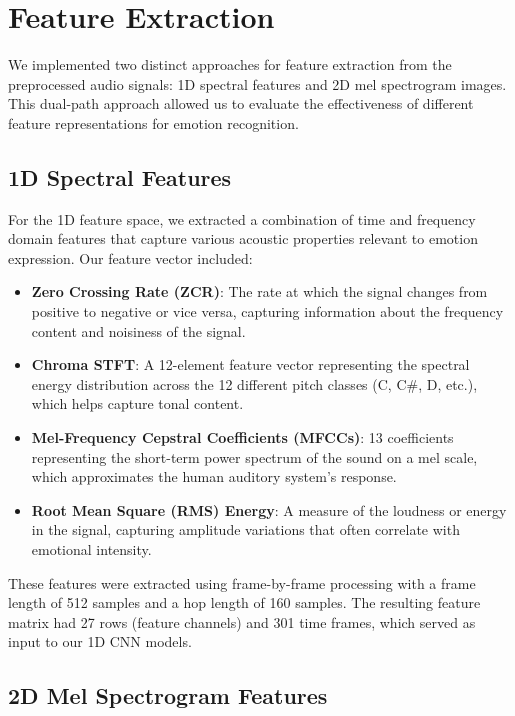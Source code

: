 \section{Feature Extraction}

We implemented two distinct approaches for feature extraction from the preprocessed audio signals: 1D spectral features and 2D mel spectrogram images. This dual-path approach allowed us to evaluate the effectiveness of different feature representations for emotion recognition.

\subsection{1D Spectral Features}

For the 1D feature space, we extracted a combination of time and frequency domain features that capture various acoustic properties relevant to emotion expression. Our feature vector included:

\begin{itemize}
    \item \textbf{Zero Crossing Rate (ZCR)}: The rate at which the signal changes from positive to negative or vice versa, capturing information about the frequency content and noisiness of the signal.
    
    \item \textbf{Chroma STFT}: A 12-element feature vector representing the spectral energy distribution across the 12 different pitch classes (C, C\#, D, etc.), which helps capture tonal content.
    
    \item \textbf{Mel-Frequency Cepstral Coefficients (MFCCs)}: 13 coefficients representing the short-term power spectrum of the sound on a mel scale, which approximates the human auditory system's response.
    
    \item \textbf{Root Mean Square (RMS) Energy}: A measure of the loudness or energy in the signal, capturing amplitude variations that often correlate with emotional intensity.
\end{itemize}

These features were extracted using frame-by-frame processing with a frame length of 512 samples and a hop length of 160 samples. The resulting feature matrix had 27 rows (feature channels) and 301 time frames, which served as input to our 1D CNN models.

\subsection{2D Mel Spectrogram Features}

